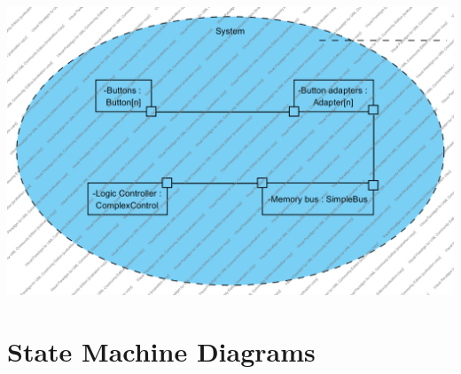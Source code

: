 \documentclass{article}
\begin{document}
  \includegraphics[width=\linewidth]{../comp2}


\section{State Machine Diagrams}
\end{document}
